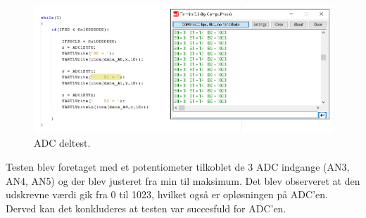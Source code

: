 \begin{figure}[h!]
  \centering
  \includegraphics[width=1.0\textwidth]{figures/adc_software_test.png}
  \caption{ADC deltest.}
  \label{adcDelTest}
\end{figure} 


Testen blev foretaget med et potentiometer tilkoblet de 3 ADC indgange (AN3, AN4, AN5) og der blev justeret fra min til maksimum. Det blev observeret at den udskrevne værdi gik fra 0 til 1023, hvilket også er opløsningen på ADC'en. Derved kan det konkluderes at testen var succesfuld for ADC'en.


